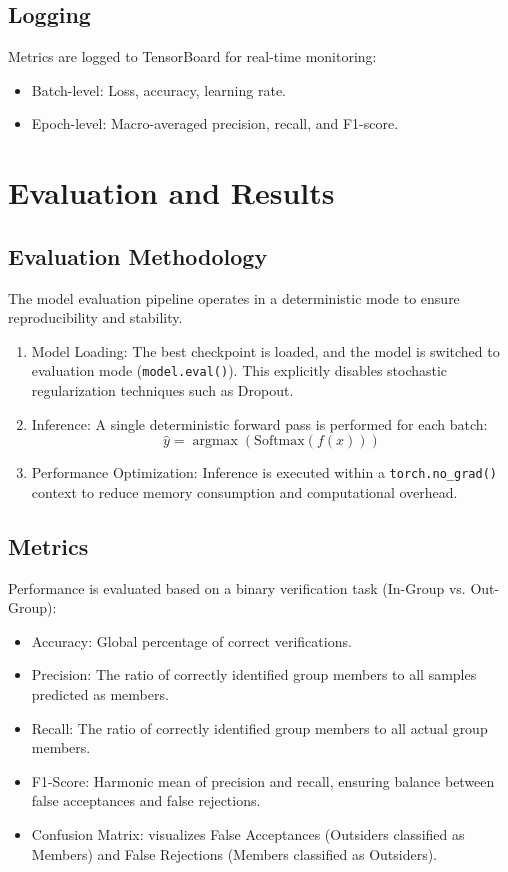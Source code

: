 \documentclass[12pt,a4paper]{article}
\begin{document}
\subsection{Logging}

Metrics are logged to TensorBoard for real-time monitoring:
\begin{itemize}
    \item Batch-level: Loss, accuracy, learning rate.
    \item Epoch-level: Macro-averaged precision, recall, and F1-score.
\end{itemize}




\section{Evaluation and Results}

\subsection{Evaluation Methodology}

The model evaluation pipeline operates in a deterministic mode to ensure reproducibility and stability.

\begin{enumerate}
    \item Model Loading: The best checkpoint is loaded, and the model is switched to evaluation mode (\texttt{model.eval()}). This explicitly disables stochastic regularization techniques such as Dropout.
    \item Inference: A single deterministic forward pass is performed for each batch:
    $$ \hat{y} = \operatorname{argmax}(\text{Softmax}(f(x))) $$
    \item Performance Optimization: Inference is executed within a \texttt{torch.no\_grad()} context to reduce memory consumption and computational overhead.
\end{enumerate}

\subsection{Metrics}

Performance is evaluated based on a binary verification task (In-Group vs. Out-Group):
\begin{itemize}
    \item Accuracy: Global percentage of correct verifications.
    \item Precision: The ratio of correctly identified group members to all samples predicted as members.
    \item Recall: The ratio of correctly identified group members to all actual group members.
    \item F1-Score: Harmonic mean of precision and recall, ensuring balance between false acceptances and false rejections.
    \item Confusion Matrix: visualizes False Acceptances (Outsiders classified as Members) and False Rejections (Members classified as Outsiders).
\end{itemize}
\end{document}
